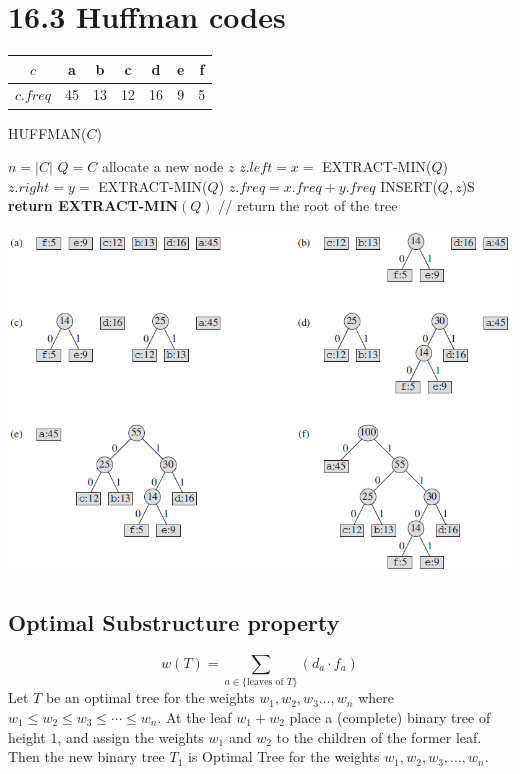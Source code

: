 \documentclass[a4paper]{article}
\begin{document}
\section*{16.3 Huffman codes}
    \begin{tabular}{c|cccccc}
         $c$ & a & b & c & d & e & f\\
         \hline
         $c.freq$& 45 & 13 & 12 & 16 & 9 & 5
    \end{tabular}
    \begin{algorithm}[H]%
        \caption{HUFFMAN($C$)}
        \begin{algorithmic}[1] %
            \State $n=|C|$
            \State $Q=C$
                \State allocate a new node $z$
                \State $z.left=x=$ EXTRACT-MIN($Q$)
                \State $z.right=y=$ EXTRACT-MIN($Q$)
                \State $z.freq=x.freq+y.freq$
                \State INSERT($Q,z$)S
            \EndFor
            \State \textbf{return EXTRACT-MIN}$(Q)$ // return the root of the tree
        \end{algorithmic}
    \end{algorithm}
    \includegraphics[width=\textwidth]{"huffman"}
\subsection*{Optimal Substructure property}
\begin{equation*}
w(T)=\sum_{a\in \{\text{leaves of }T\}}{(d_a \cdot f_a)}
\end{equation*}
Let $T$ be an optimal tree for the weights $w_1,w_2,w_3\ldots,w_n$ where $w_1\leq w_2\leq w_3\leq \cdots \leq w_n$. At the leaf $w_1+w_2$ place a (complete) binary tree of height $1$, and assign the weights $w_1$ and $w_2$ to the children of the former leaf. Then the new binary tree $T_1$ is Optimal Tree for the weights $w_1, w_2, w_3, \ldots , w_n$. \\
\end{document}
